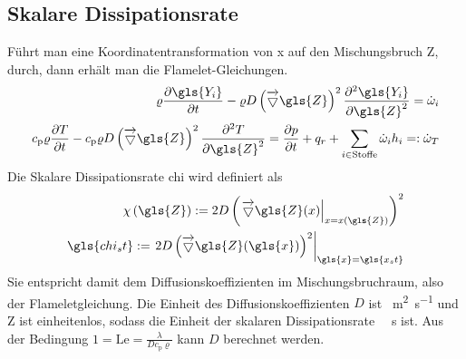 \subsection{Skalare Dissipationsrate}
\label{sct:chist}

Führt man eine Koordinatentransformation von \gls{x} auf den Mischungsbruch \gls{Z}, durch, dann erhält man die Flamelet-Gleichungen\cite[16]{hasse-pdf08}\cite[94]{poinsot2005theoretical}.
\begin{align}
    \varrho \fpart{ \gls{Y_i} }{t} -
    \varrho D \left( \nabla\gls{Z} \right)^2
        \frac{ \partial^2 \gls{Y_i}  }{ \partial \gls{Z}^2 }
    = \dot{\omega}_i \\
    c_\mathrm{p} \varrho \fpart{T}{t} -
    c_\mathrm{p} \varrho D \left( \nabla \gls{Z} \right)^2
        \frac{ \partial^2 T }{ \partial \gls{Z}^2 }
    = \fpart{p}{t} + q_r + \sum\limits_{i \in \text{Stoffe} } \dot{\omega}_i h_i
    =: \dot{\omega}_T
\end{align}
Die Skalare Dissipationsrate \gls{chi} wird definiert als
\begin{align}
    \chi\left( \gls{Z} \right)
    := 2 D \left( \left. \nabla \gls{Z}(x) \right|_{ x = x \left( \gls{Z} \right) } \right)^2 \\
    \gls{chi_st}
    := \left.
        2 D \left( \nabla \gls{Z}( \gls{x} ) \right)^2
    \right|_{ \gls{x} = \gls{x_st} }
\end{align}
Sie entspricht damit dem Diffusionskoeffizienten im Mischungsbruchraum, also der Flameletgleichung. Die Einheit des Diffusionskoeffizienten $D$ ist \SI{}{\square\meter\per\second} und \gls{Z} ist einheitenlos, sodass die Einheit der skalaren Dissipationsrate \SI{}{\per\second} ist. Aus der Bedingung $1=\mathrm{Le}=\frac{\lambda}{D c_\mathrm{p} \varrho}$ kann $D$ berechnet werden.

